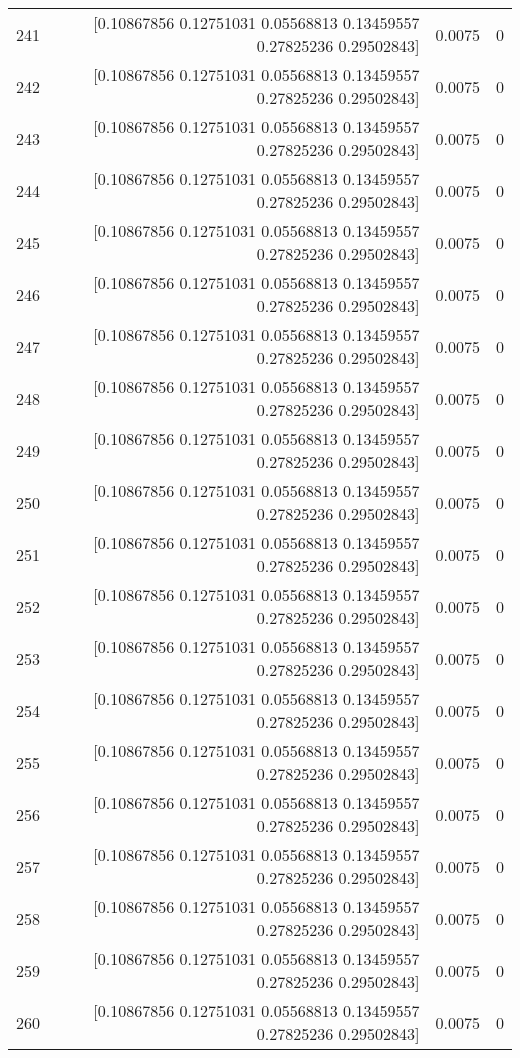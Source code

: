 \begin{longtable}{lrrr}
241 & [0.10867856 0.12751031 0.05568813 0.13459557 0.27825236 0.29502843] & 0.0075 & 0 \\
242 & [0.10867856 0.12751031 0.05568813 0.13459557 0.27825236 0.29502843] & 0.0075 & 0 \\
243 & [0.10867856 0.12751031 0.05568813 0.13459557 0.27825236 0.29502843] & 0.0075 & 0 \\
244 & [0.10867856 0.12751031 0.05568813 0.13459557 0.27825236 0.29502843] & 0.0075 & 0 \\
245 & [0.10867856 0.12751031 0.05568813 0.13459557 0.27825236 0.29502843] & 0.0075 & 0 \\
246 & [0.10867856 0.12751031 0.05568813 0.13459557 0.27825236 0.29502843] & 0.0075 & 0 \\
247 & [0.10867856 0.12751031 0.05568813 0.13459557 0.27825236 0.29502843] & 0.0075 & 0 \\
248 & [0.10867856 0.12751031 0.05568813 0.13459557 0.27825236 0.29502843] & 0.0075 & 0 \\
249 & [0.10867856 0.12751031 0.05568813 0.13459557 0.27825236 0.29502843] & 0.0075 & 0 \\
250 & [0.10867856 0.12751031 0.05568813 0.13459557 0.27825236 0.29502843] & 0.0075 & 0 \\
251 & [0.10867856 0.12751031 0.05568813 0.13459557 0.27825236 0.29502843] & 0.0075 & 0 \\
252 & [0.10867856 0.12751031 0.05568813 0.13459557 0.27825236 0.29502843] & 0.0075 & 0 \\
253 & [0.10867856 0.12751031 0.05568813 0.13459557 0.27825236 0.29502843] & 0.0075 & 0 \\
254 & [0.10867856 0.12751031 0.05568813 0.13459557 0.27825236 0.29502843] & 0.0075 & 0 \\
255 & [0.10867856 0.12751031 0.05568813 0.13459557 0.27825236 0.29502843] & 0.0075 & 0 \\
256 & [0.10867856 0.12751031 0.05568813 0.13459557 0.27825236 0.29502843] & 0.0075 & 0 \\
257 & [0.10867856 0.12751031 0.05568813 0.13459557 0.27825236 0.29502843] & 0.0075 & 0 \\
258 & [0.10867856 0.12751031 0.05568813 0.13459557 0.27825236 0.29502843] & 0.0075 & 0 \\
259 & [0.10867856 0.12751031 0.05568813 0.13459557 0.27825236 0.29502843] & 0.0075 & 0 \\
260 & [0.10867856 0.12751031 0.05568813 0.13459557 0.27825236 0.29502843] & 0.0075 & 0 \\

\end{longtable}
